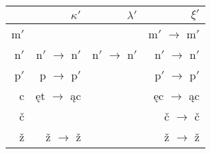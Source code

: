 \documentclass{article}
\begin{document}
\begin{longtable}{r|rrr}
 & \boldmath$\kappa'$ & \boldmath$\lambda'$ & \boldmath$\xi'$\\
\hline
m$'$ &  &  & m$'$ $\rightarrow$ m$'$\\
\hline
n$'$ & n$'$ $\rightarrow$ n$'$ & n$'$ $\rightarrow$ n$'$ & n$'$ $\rightarrow$ n$'$\\
\hline
p$'$ & p $\rightarrow$ p$'$ &  & p$'$ $\rightarrow$ p$'$\\
\hline
c & ęt $\rightarrow$ ąc &  & ęc $\rightarrow$ ąc\\
\hline
č &  &  & č $\rightarrow$ č\\
\hline
ž & ž $\rightarrow$ ž &  & ž $\rightarrow$ ž\\
\hline
\end{longtable}
\end{document}
